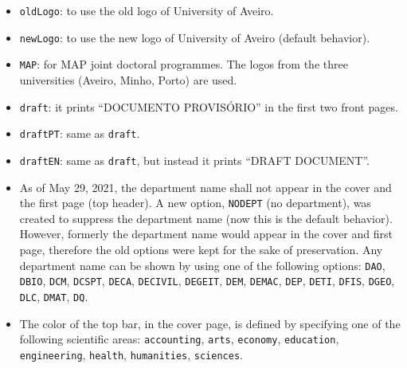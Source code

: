 \begin{itemize}

\item
\texttt{oldLogo}: to use the old logo of University of Aveiro.

\item
\texttt{newLogo}: to use the new logo of University of Aveiro (default behavior).

\item
\texttt{MAP}: for MAP joint doctoral programmes. The logos from the three universities (Aveiro, Minho, Porto) are used.

\item
\texttt{draft}: it prints ``DOCUMENTO PROVISÓRIO'' in the first two front pages.

\item
\texttt{draftPT}: same as \texttt{draft}.

\item
\texttt{draftEN}: same as \texttt{draft}, but instead it prints ``DRAFT DOCUMENT''.

\item
As of May 29, 2021, the department name shall not appear in the cover and the first page (top header).
A new option, \texttt{NODEPT} (no department), was created to suppress the department name (now this is the default behavior).\\
However, formerly the department name would appear in the cover and first page, therefore the old options were kept for the sake of preservation.
Any department name can be shown by using one of the following options: \texttt{DAO}, \texttt{DBIO}, \texttt{DCM}, \texttt{DCSPT}, \texttt{DECA}, \texttt{DECIVIL}, \texttt{DEGEIT}, \texttt{DEM}, \texttt{DEMAC}, \texttt{DEP}, \texttt{DETI}, \texttt{DFIS}, \texttt{DGEO}, \texttt{DLC}, \texttt{DMAT}, \texttt{DQ}.

\item
The color of the top bar, in the cover page, is defined by specifying one of the following scientific areas: \texttt{accounting}, \texttt{arts}, \texttt{economy}, \texttt{education}, \texttt{engineering}, \texttt{health}, \texttt{humanities}, \texttt{sciences}.

\end{itemize}
